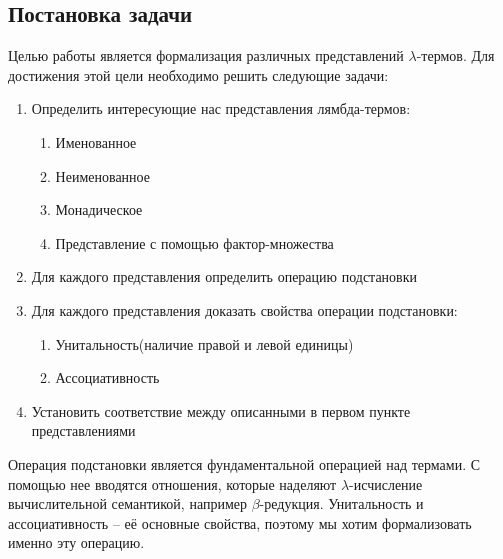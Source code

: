\subsection{Постановка задачи}

Целью работы является формализация различных представлений $\lambda$-термов. Для достижения этой цели необходимо решить следующие задачи:

\begin{enumerate}
  \item Определить интересующие нас представления лямбда-термов:
    \begin{enumerate}
      \item Именованное
      \item Неименованное
      \item Монадическое
      \item Представление с помощью фактор-множества
    \end{enumerate}
  \item Для каждого представления определить операцию подстановки
  \item Для каждого представления доказать свойства операции подстановки:
    \begin{enumerate}
      \item Унитальность(наличие правой и левой единицы)
      \item Ассоциативность
    \end{enumerate}
  \item Установить соответствие между описанными в первом пункте представлениями
\end{enumerate}

Операция подстановки является фундаментальной операцией над термами. С помощью нее вводятся отношения, которые наделяют $\lambda$-исчисление вычислительной семантикой, например $\beta$-редукция. Унитальность и ассоциативность -- её основные свойства, поэтому мы хотим формализовать именно эту операцию.
